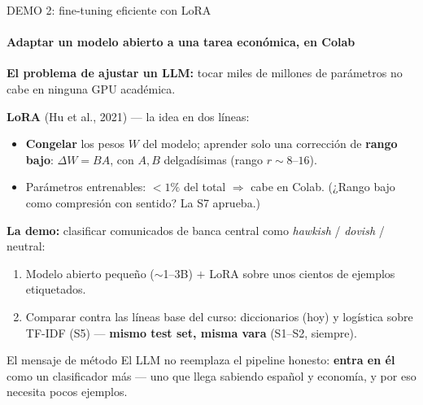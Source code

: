 \documentclass{beamer}
\newcommand{\1}{\mathbb{I}}
\begin{document}
\begin{frame}{DEMO 2: fine-tuning eficiente con LoRA}
\framesubtitle{Adaptar un modelo abierto a una tarea económica, en Colab}
\small
\textbf{El problema de ajustar un LLM:} tocar miles de millones de parámetros no cabe en ninguna GPU académica.
\pause

\vspace{0.15cm}
\textbf{LoRA} (Hu et al., 2021) --- la idea en dos líneas:
\begin{itemize}\itemsep4pt
  \item \textbf{Congelar} los pesos $W$ del modelo; aprender solo una corrección de \textbf{rango bajo}: $\Delta W = B A$, con $A, B$ delgadísimas (rango $r \sim 8$--$16$).
  \item Parámetros entrenables: $< 1\%$ del total $\Rightarrow$ cabe en Colab. (¿Rango bajo como compresión con sentido? La S7 aprueba.)
\end{itemize}
\pause

\vspace{0.15cm}
\textbf{La demo:} clasificar comunicados de banca central como \emph{hawkish} / \emph{dovish} / neutral:
\begin{enumerate}\itemsep3pt
  \item Modelo abierto pequeño ($\sim$1--3B) $+$ LoRA sobre unos cientos de ejemplos etiquetados.
  \item Comparar contra las líneas base del curso: diccionarios (hoy) y logística sobre TF-IDF (S5) --- \textbf{mismo test set, misma vara} (S1--S2, siempre).
\end{enumerate}
\pause

\begin{block}{El mensaje de método}
El LLM no reemplaza el pipeline honesto: \textbf{entra en él} como un clasificador más --- uno que llega sabiendo español y economía, y por eso necesita pocos ejemplos.
\end{block}
\end{frame}
\end{document}
